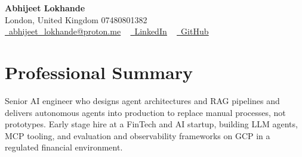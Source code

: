 \documentclass[a4paper,10pt]{article}
\begin{document}
    \begin{center}
        {\Huge\bfseries Abhijeet Lokhande}
        \\[2pt] {\color{muted}London, United Kingdom \textbar{} 07480801382}\\
        \small
        \href{mailto:abhijeet_lokhande@proton.me}{\raisebox{-0.2\height}{\color{primary}\faEnvelope}\  \underline{abhijeet\_lokhande@proton.me}} ~
        \href{https://www.linkedin.com/in/ablds/}{\raisebox{-0.2\height}{\color{primary}\faLinkedin}\ \underline{LinkedIn}}  ~
        \href{https://github.com/abhijeetscode}{\raisebox{-0.2\height}{\color{primary}\faGithub}\ \underline{GitHub}}
    \end{center}

\section{Professional Summary}
\vspace{-5pt}
{\color{muted}Senior AI engineer who designs agent architectures and RAG pipelines and delivers autonomous agents into production to replace manual processes, not prototypes. Early stage hire at a FinTech and AI startup, building LLM agents, MCP tooling, and evaluation and observability frameworks on GCP in a regulated financial environment.}
\vspace{2pt}

\end{document}
